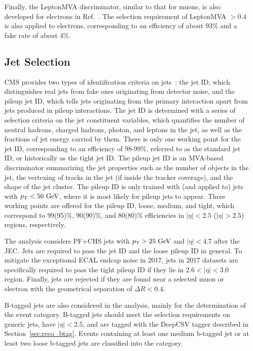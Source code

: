 Finally, the LeptonMVA discriminator, similar to that for muons, is also developed for electrons in Ref.~\cite{PhysRevLett.122.132003}. 
The selection requirement of LeptonMVA $> 0.4$ is also applied to electrons, 
corresponding to an efficiency of about 93\% and a fake rate of about 4\%.

\subsection{Jet Selection}\label{sec:sel_jet}

CMS provides two types of identification criteria on jets~\cite{Sirunyan_2020}: the jet ID, which distinguishes real jets from fake ones originating from detector noise,
and the pileup jet ID, which tells jets originating from the primary interaction apart from jets produced in pileup interactions.
The jet ID is determined with a series of selection criteria on the jet constituent variables,
which quantifies the number of neutral hadrons, charged hadrons, photon, and leptons in the jet, 
as well as the fractions of jet energy carried by them.
There is only one working point for the jet ID, corresponding to an efficiency of 98-99\%, referred to as the standard jet ID, or historically as the tight jet ID.
The pileup jet ID is an MVA-based discriminator summarizing the jet properties such as the number of objects in the jet, 
the vertexing of tracks in the jet (if inside the tracker coverage), and the shape of the jet cluster.
The pileup ID is only trained with (and applied to) jets with $p_{\mathrm{T}} < 50~\mbox{GeV}$, where it is most likely for pileup jets to appear.
Three working points are offered for the pileup ID, loose, medium, and tight, 
which correspond to 99(95)\%, 90(90)\%, and 80(80)\% efficiencies in $|\eta| < 2.5$ ($|\eta| > 2.5$) regions, respectively.

The \hmm analysis considers PF+CHS jets with $p_{\mathrm{T}} > 25~\mbox{GeV}$ and $|\eta| < 4.7$ after the JEC. 
Jets are required to pass the jet ID and the loose pileup ID in general.
To mitigate the exceptional ECAL endcap noise in 2017,
jets in 2017 datasets are specifically required to pass the tight pileup ID if they lie in $2.6 < |\eta| < 3.0$ region.
Finally, jets are rejected if they are found near a selected muon or electron with the geometrical separation of $\Delta{}R < 0.4$.

B-tagged jets are also considered in the \hmm analysis, mainly for the determination of the \ttH event category.
B-tagged jets should meet the selection requirements on generic jets, have $|\eta| < 2.5$, and are tagged with the DeepCSV tagger described in Section~\ref{sec:reco_btag}.
Events containing at least one medium b-tagged jet or at least two loose b-tagged jets are classified into the \ttH category.